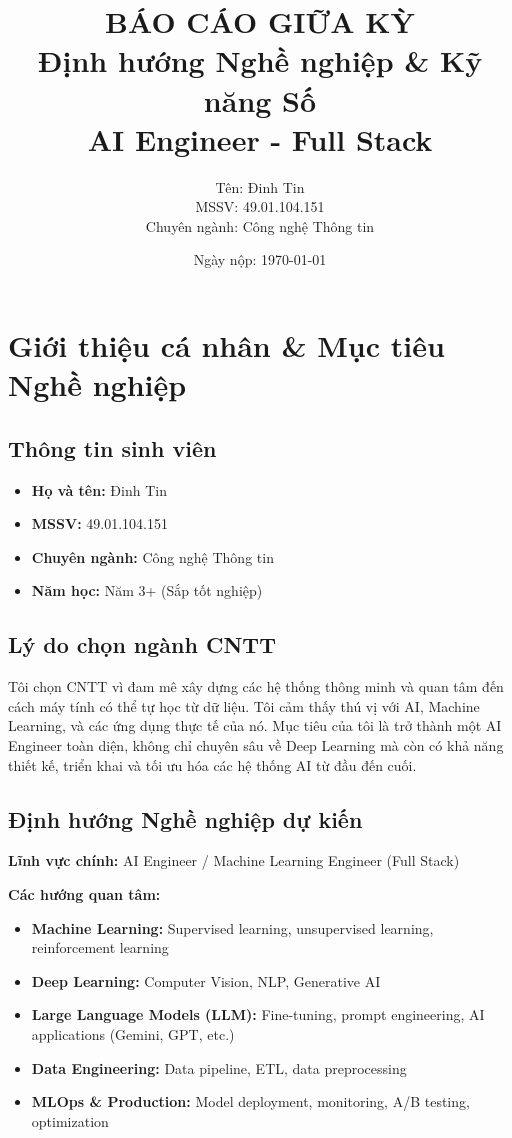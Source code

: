 \documentclass[12pt,a4paper]{article}
\title{\textbf{BÁO CÁO GIỮA KỲ}\\
\Large{Định hướng Nghề nghiệp \& Kỹ năng Số}\\
\large{AI Engineer - Full Stack}}
\author{Tên: Đinh Tin\\MSSV: 49.01.104.151\\Chuyên ngành: Công nghệ Thông tin}
\date{Ngày nộp: \today}
\begin{document}
\maketitle

\newpage
\tableofcontents
\newpage


\section{Giới thiệu cá nhân \& Mục tiêu Nghề nghiệp}

\subsection{Thông tin sinh viên}
\begin{itemize}
    \item \textbf{Họ và tên:} Đinh Tin
    \item \textbf{MSSV:} 49.01.104.151
    \item \textbf{Chuyên ngành:} Công nghệ Thông tin
    \item \textbf{Năm học:} Năm 3+ (Sắp tốt nghiệp)
\end{itemize}

\subsection{Lý do chọn ngành CNTT}

Tôi chọn CNTT vì đam mê xây dựng các hệ thống thông minh và quan tâm đến cách máy tính có thể tự học từ dữ liệu. Tôi cảm thấy thú vị với AI, Machine Learning, và các ứng dụng thực tế của nó. Mục tiêu của tôi là trở thành một AI Engineer toàn diện, không chỉ chuyên sâu về Deep Learning mà còn có khả năng thiết kế, triển khai và tối ưu hóa các hệ thống AI từ đầu đến cuối.

\subsection{Định hướng Nghề nghiệp dự kiến}

\textbf{Lĩnh vực chính:} AI Engineer / Machine Learning Engineer (Full Stack)

\textbf{Các hướng quan tâm:}
\begin{itemize}
    \item \textbf{Machine Learning:} Supervised learning, unsupervised learning, reinforcement learning
    \item \textbf{Deep Learning:} Computer Vision, NLP, Generative AI
    \item \textbf{Large Language Models (LLM):} Fine-tuning, prompt engineering, AI applications (Gemini, GPT, etc.)
    \item \textbf{Data Engineering:} Data pipeline, ETL, data preprocessing
    \item \textbf{MLOps \& Production:} Model deployment, monitoring, A/B testing, optimization
\end{itemize}
\end{document}
